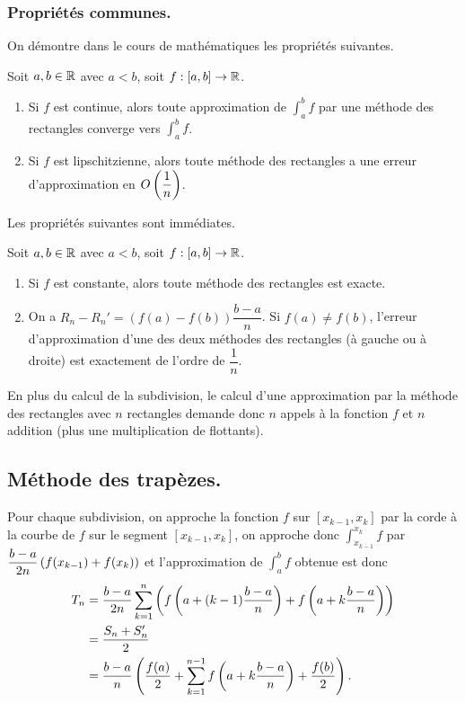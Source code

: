 \subsubsection{Propriétés communes.}

On démontre dans le cours de mathématiques les propriétés suivantes. 

\begin{prop}
  Soit $a,b \in \mathbb{R}$ avec $a<b$, soit $f : [a,b] \to \mathbb{R}$. 
  \begin{enumerate}
    \item Si $f$ est continue, alors toute approximation de $\displaystyle\int_a^b f$ par une méthode des rectangles converge vers $\displaystyle\int_a^b f$. 
    \item Si $f$ est lipschitzienne, alors toute méthode des rectangles a une erreur d'approximation en $O\left( \dfrac{1}{n}\right)$. 
  \end{enumerate}
\end{prop}

Les propriétés suivantes sont immédiates. 

\begin{prop}
  Soit $a,b \in \mathbb{R}$ avec $a<b$, soit $f : [a,b] \to \mathbb{R}$. 
  \begin{enumerate}
    \item Si $f$ est constante, alors toute méthode des rectangles est exacte. 
    \item On a $R_n - R_n' = (f(a)-f(b))\dfrac{b-a}{n}$. Si $f(a) \neq f(b)$, l'erreur d'approximation d'une des deux méthodes des rectangles (à gauche ou à droite) est exactement de l'ordre de $\dfrac{1}{n}$. 
  \end{enumerate}
\end{prop}

\begin{rem}
  En plus du calcul de la subdivision, le calcul d'une approximation par la méthode des rectangles avec $n$ rectangles demande donc $n$ appels à la fonction $f$ et $n$ addition (plus une multiplication de flottants).
\end{rem}

\subsection{Méthode des trapèzes.}

Pour chaque subdivision, on approche la fonction $f$ sur $[x_{k-1},x_{k}]$ par la corde à la courbe de $f$ sur le segment $[x_{k-1},x_{k}]$, on approche donc $\displaystyle\int_{x_{k-1}}^{x_{k}} f$ par $\dfrac{b-a}{2n}\left( f(x_{k-1}) + f(x_k)\right)$ et l'approximation de  $\displaystyle\int_a^b f$ obtenue est donc 
\begin{align*}
  T_n &= \dfrac{b-a}{2n} \sum_{k=1}^n \left( f\left( a+(k-1)\dfrac{b-a}{n}\right) + f\left( a+k\dfrac{b-a}{n}\right)\right) \\
      &= \dfrac{S_n + S_n'}{2} \\
      &= \dfrac{b-a}{n}\left(  \dfrac{f(a)}{2} + \sum_{k=1}^{n-1}  f\left( a+k\dfrac{b-a}{n}\right) + \dfrac{f(b)}{2}\right).
\end{align*}

